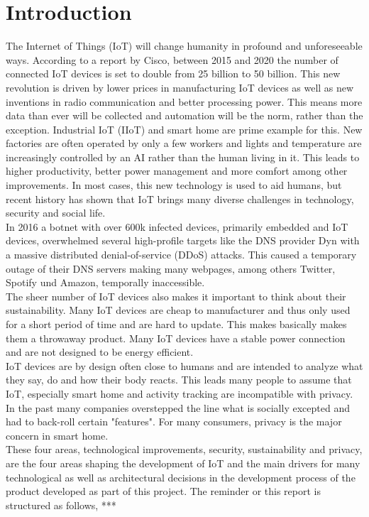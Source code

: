 \section{Introduction}
The Internet of Things (IoT) will change humanity in profound and unforeseeable ways\cite{ciscoReport}. According to a report by Cisco, between 2015 and 2020 the number of connected IoT devices is set to double from 25 billion to 50 billion\cite{ciscoReport}. This new revolution is driven by lower prices in manufacturing IoT devices as well as new inventions in radio communication and better processing power. This means more data than ever will be collected and automation will be the norm, rather than the exception. Industrial IoT (IIoT) and smart home are prime example for this. New factories are often operated by only a few workers and lights and temperature are increasingly controlled by an AI rather than the human living in it. This leads to higher productivity, better power management and more comfort among other improvements. In most cases, this new technology is used to aid humans, but recent history has shown that IoT brings many diverse challenges in technology, security and social life.\\
In 2016 a botnet with over 600k infected devices, primarily embedded and IoT devices, overwhelmed several high-profile targets like the DNS provider Dyn with a massive distributed denial-of-service (DDoS) attacks. This caused a temporary outage of their DNS servers making many webpages, among others  Twitter, Spotify und Amazon, temporally inaccessible.\\
The sheer number of IoT devices also makes it important to think about their sustainability. Many IoT devices are cheap to manufacturer and thus only used for a short period of time and are hard to update. This makes basically makes them a throwaway product. Many IoT devices have a stable power connection and are not designed to be energy efficient. \\
IoT devices are by design often close to humans and are intended to analyze what they say, do and how their body reacts. This leads many people to assume that IoT, especially smart home and activity tracking are incompatible with privacy\cite{5Reasons41:online}. In the past many companies overstepped the line what is socially excepted and had to back-roll certain "features"\cite{PrivacyIoT50:online}. For many consumers, privacy is the major concern in smart home\cite{PrivacyIoT50:online}.\\
These four areas, technological improvements, security, sustainability and privacy, are the four areas shaping the development of IoT and the main drivers for many technological as well as architectural decisions in the development process of the product developed as part of this project. The reminder or this report is structured as follows, *** 

